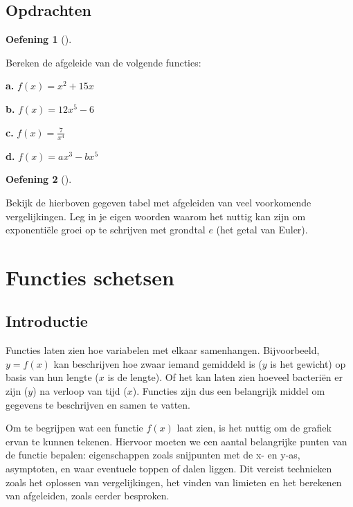 \documentclass[
  a4paper,
]{scrbook}
\theoremstyle{definition}
\newtheorem{exercise}{Oefening}[chapter]
\theoremstyle{remark}
\begin{document}
\section{Opdrachten}\label{opdrachten-4}

\begin{exercise}[]\protect\hypertarget{exr-afg-1}{}\label{exr-afg-1}

Bereken de afgeleide van de volgende functies:

\textbf{a.} \(f(x)=x^2+15x\)

\textbf{b.} \(f(x)=12x^5-6\)

\textbf{c.} \(f(x)=\frac{7}{x^4}\)

\textbf{d.} \(f(x)=ax^3-bx^5\)

\end{exercise}

\begin{exercise}[]\protect\hypertarget{exr-afg-2}{}\label{exr-afg-2}

Bekijk de hierboven gegeven tabel met afgeleiden van veel voorkomende
vergelijkingen. Leg in je eigen woorden waarom het nuttig kan zijn om
exponentiële groei op te schrijven met grondtal \(e\) (het getal van
Euler).

\end{exercise}

\chapter{Functies schetsen}\label{sec-schetsen}

\section{Introductie}\label{introductie-5}

Functies laten zien hoe variabelen met elkaar samenhangen. Bijvoorbeeld,
\(y=f(x)\) kan beschrijven hoe zwaar iemand gemiddeld is (\(y\) is het
gewicht) op basis van hun lengte (\(x\) is de lengte). Of het kan laten
zien hoeveel bacteriën er zijn (\(y\)) na verloop van tijd (\(x\)).
Functies zijn dus een belangrijk middel om gegevens te beschrijven en
samen te vatten.

Om te begrijpen wat een functie \(f(x)\) laat zien, is het nuttig om de
grafiek ervan te kunnen tekenen. Hiervoor moeten we een aantal
belangrijke punten van de functie bepalen: eigenschappen zoals
snijpunten met de x- en y-as, asymptoten, en waar eventuele toppen of
dalen liggen. Dit vereist technieken zoals het oplossen van
vergelijkingen, het vinden van limieten en het berekenen van afgeleiden,
zoals eerder besproken.
\end{document}
